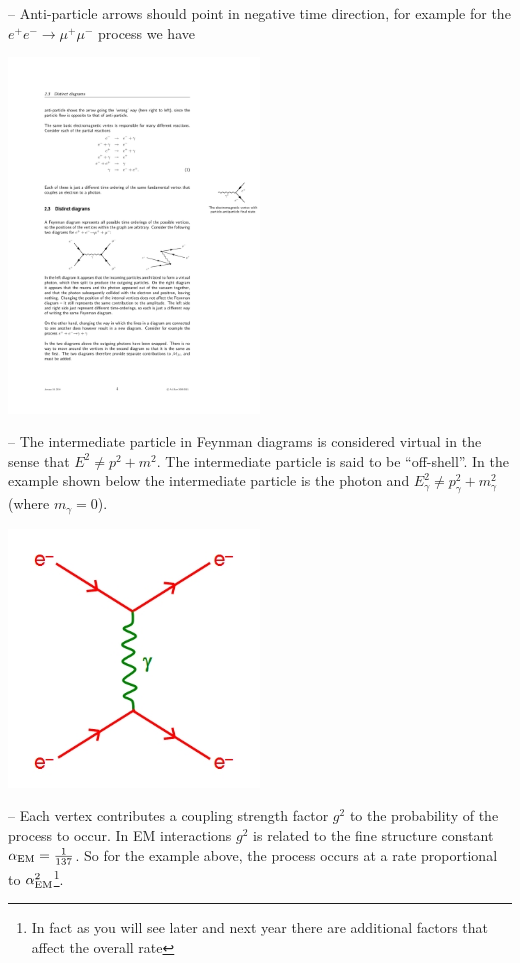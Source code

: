 -- Anti-particle arrows should point in negative time direction, for example for the $e^+e^-\to \mu^+\mu^-$ process we have
\begin{center}
\includegraphics[width=0.5\textwidth]{fig/forcerange/eetomm.pdf}
\end{center}


-- The intermediate particle in Feynman diagrams is considered virtual in the sense that 
$E^2\neq p^2+m^{2}$. The intermediate particle is said to be ``off-shell''. In the example shown below the intermediate particle is the photon and $E^2_{\gamma}\neq p^2_{\gamma}+m_{\gamma}^{2}$ (where $m_\gamma=0$). 
\begin{center}
\includegraphics[width=0.5\textwidth]{fig/forcerange/qed.jpg}
\end{center}

-- Each vertex contributes a coupling strength factor $g^2$ to the probability of the process to occur. In EM interactions $g^2$ is related to the fine structure constant $\alpha_{\rm EM}=\frac{1}{137}$. So for the example above, the process occurs at a rate proportional to $\alpha_{\rm EM}^2$\footnote{In fact as you will see later and next year there are additional factors that affect the overall rate}.



